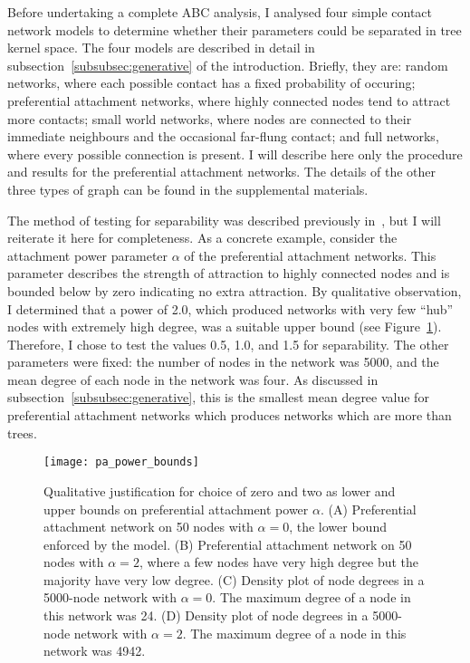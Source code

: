 Before undertaking a complete ABC analysis, I analysed four simple contact
network models to determine whether their parameters could be separated in tree
kernel space. The four models are described in detail in
subsection~\ref{subsubsec:generative} of the introduction. Briefly, they are:
random networks, where each possible contact has a fixed probability of
occuring; preferential attachment networks, where highly connected nodes tend
to attract more contacts; small world networks, where nodes are connected to
their immediate neighbours and the occasional far-flung contact; and full
networks, where every possible connection is present. I will describe here only
the procedure and results for the preferential attachment networks. The details
of the other three types of graph can be found in the supplemental materials.

The method of testing for separability was described previously
in~\autocite{poon2015phylodynamic}, but I will reiterate it here for
completeness. As a concrete example, consider the attachment power parameter
$\alpha$ of the preferential attachment networks. This parameter describes the
strength of attraction to highly connected nodes and is bounded below by zero
indicating no extra attraction. By qualitative observation, I determined that a
power of 2.0, which produced networks with very few ``hub'' nodes with
extremely high degree, was a suitable upper bound (see
Figure~\ref{fig:pabounds}). Therefore, I chose to test the values 0.5, 1.0, and
1.5 for separability. The other parameters were fixed: the number of nodes in
the network was 5000, and the mean degree of each node in the network was four.
As discussed in subsection~\ref{subsubsec:generative}, this is the smallest
mean degree value for preferential attachment networks which produces networks
which are more than trees. 

\begin{figure}[ht]
  \centering
  \label{fig:pabounds}
  \texttt{[image: pa\_power\_bounds]}
  \caption[Upper and lower bounds on preferential attachment power]{
    Qualitative justification for choice of zero and two as lower and upper
    bounds on preferential attachment power $\alpha$. (A) Preferential
    attachment network on 50 nodes with $\alpha = 0$, the lower bound enforced
    by the model. (B) Preferential attachment network on 50 nodes with $\alpha
    = 2$, where a few nodes have very high degree but the majority have very
    low degree. (C) Density plot of node degrees in a 5000-node network with
    $\alpha = 0$. The maximum degree of a node in this network was 24. (D)
    Density plot of node degrees in a 5000-node network with $\alpha = 2$. The
    maximum degree of a node in this network was 4942. 
  }
\end{figure}

